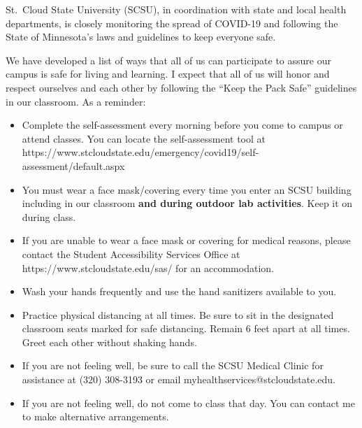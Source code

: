 \documentclass{tufte-handout}
\begin{document}
\begin{fullwidth}



\newpage




St.\ Cloud State University (SCSU), in coordination with state and local health departments, is closely monitoring the spread of COVID-19 and following the State of Minnesota's laws and guidelines to keep everyone safe.

We have developed a list of ways that all of us can participate to assure our campus is safe for living and learning. I expect that all of us will honor and respect ourselves and each other by following the ``Keep the Pack Safe'' guidelines in our classroom. As a reminder:

\begin{itemize}
\item Complete the self-assessment every morning before you come to campus or attend classes. You can locate the self-assessment tool at https://www.stcloudstate.edu/emergency/covid19/self-assessment/default.aspx 
\item You must wear a face mask/covering every time you enter an SCSU building including in our classroom \textbf{and during outdoor lab activities}. Keep it on during class.
\item If you are unable to wear a face mask or covering for medical reasons, please contact the Student Accessibility Services Office at https://www.stcloudstate.edu/sas/ for an accommodation.
\item Wash your hands frequently and use the hand sanitizers available to you.
\item Practice physical distancing at all times. Be sure to sit in the designated classroom seats marked for safe distancing. Remain 6 feet apart at all times. Greet each other without shaking hands.
\item If you are not feeling well, be sure to call the SCSU Medical Clinic for assistance at (320) 308-3193 or email myhealthservices@stcloudstate.edu. 
\item If you are not feeling well, do not come to class that day. You can contact me to make alternative arrangements.
\end{itemize}






\end{fullwidth}
\end{document}
